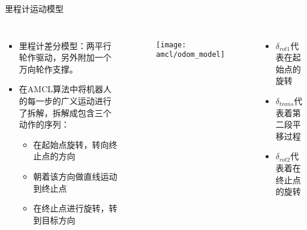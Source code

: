  \begin{frame}{里程计运动模型}
    
    \begin{columns}%
    \begin{itemize}
    \item 里程计差分模型：两平行轮作驱动，另外附加一个万向轮作支撑。
    \item 在AMCL算法中将机器人的每一步的广义运动进行了拆解，拆解成包含三个动作的序列：
      \begin{itemize}
        \item 在起始点旋转，转向终止点的方向
         \item 朝着该方向做直线运动到终止点
         \item 在终止点进行旋转，转到目标方向
      \end{itemize}

    \end{itemize}

     \begin{figure}[!h]
      \centering
      \texttt{[image: amcl/odom\_model]}\\
    \end{figure}
    \begin{itemize}
      \item $\delta_{rot1}$代表在起始点的旋转
      \item $\delta_{trans}$代表着第二段平移过程
      \item $\delta_{rot2}$代表着在终止点的旋转
    \end{itemize}
    \end{columns}
    \end{frame}

